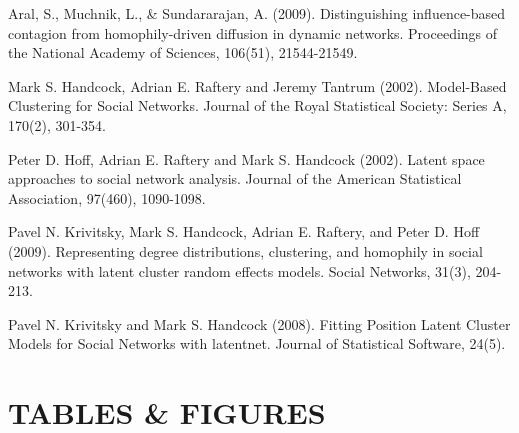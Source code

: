 \documentclass[11pt]{article}
\begin{document}
\begin{hangparas}{.25in}{1}
Aral, S., Muchnik, L., \& Sundararajan, A. (2009). Distinguishing influence-based contagion from homophily-driven diffusion in dynamic networks. Proceedings of the National Academy of Sciences, 106(51), 21544-21549.
\end{hangparas}

\begin{hangparas}{.25in}{1}
Mark S. Handcock, Adrian E. Raftery and Jeremy Tantrum (2002). Model-Based Clustering for Social Networks. Journal of the Royal Statistical Society: Series A, 170(2), 301-354.
\end{hangparas}

\begin{hangparas}{.25in}{1}
Peter D. Hoff, Adrian E. Raftery and Mark S. Handcock (2002). Latent space approaches to social network analysis. Journal of the American Statistical Association, 97(460), 1090-1098.
\end{hangparas}

\begin{hangparas}{.25in}{1}
Pavel N. Krivitsky, Mark S. Handcock, Adrian E. Raftery, and Peter D. Hoff (2009). Representing degree distributions, clustering, and homophily in social networks with latent cluster random effects models. Social Networks, 31(3), 204-213.
\end{hangparas}

\begin{hangparas}{.25in}{1}
Pavel N. Krivitsky and Mark S. Handcock (2008). Fitting Position Latent Cluster Models for Social Networks with latentnet. Journal of Statistical Software, 24(5).
\end{hangparas}


\section*{TABLES \& FIGURES}
\end{document}
